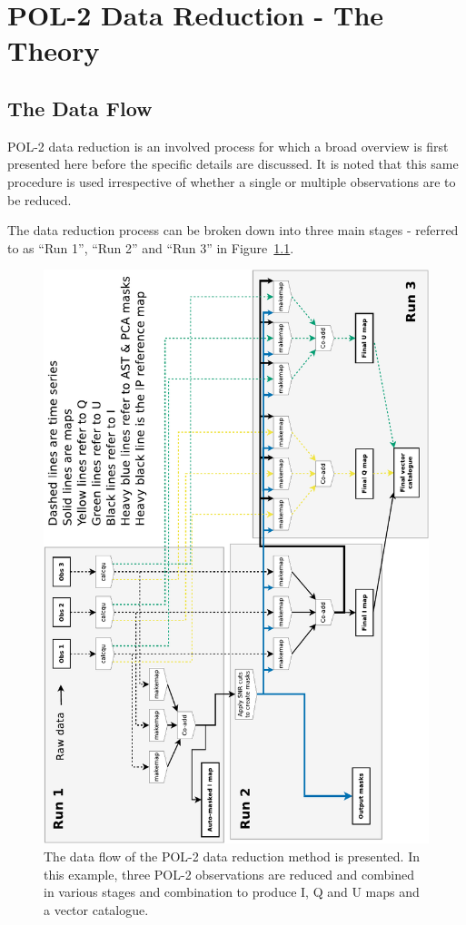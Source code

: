 \chapter{POL-2 Data Reduction - The Theory}
\label{sec:dr}
\section{The Data Flow}

POL-2 data reduction is an involved process for which a broad overview
is first presented here before the specific details are discussed. It
is noted that this same procedure is used irrespective of whether a
single or multiple observations are to be reduced.

The data reduction process can be broken down into three main stages -
referred to as ``Run 1'', ``Run 2'' and ``Run 3'' in Figure~\ref{fig:pol2drflow}.

\begin{figure}[t!]
\begin{center}
\includegraphics[width=0.85\linewidth]{pol2map_flow}
\caption [POL-2 Data Flow]{ The data flow of the POL-2 data reduction
  method is presented. In this example, three POL-2 observations are
  reduced and combined in various stages and combination to produce I,
  Q and U maps and a vector catalogue.  }
\label{fig:pol2drflow}
\end{center}
\end{figure}


